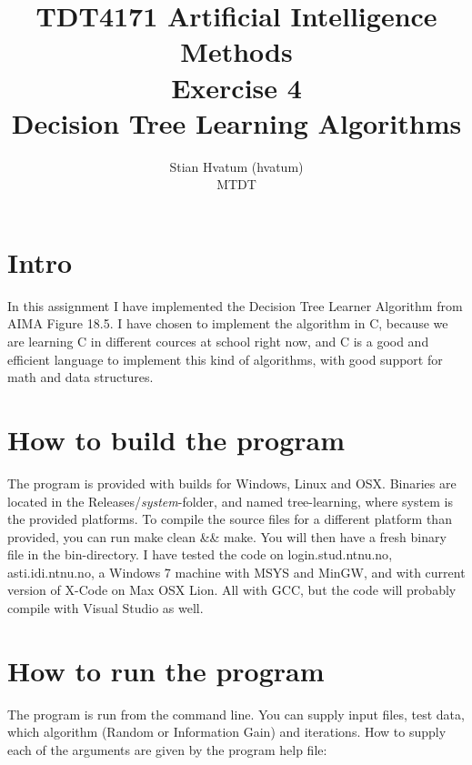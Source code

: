 \documentclass[english,a4paper]{scrartcl}
\title{TDT4171 Artificial Intelligence Methods\\
\Small Exercise 4\\
\Huge Decision Tree Learning Algorithms}
\author{Stian Hvatum (hvatum)\\MTDT}
\begin{document}
\maketitle
\thispagestyle{empty}
\newpage
{}
\tableofcontents
\newpage
{}
\section{Intro}
In this assignment I have implemented the Decision Tree Learner Algorithm from
AIMA Figure 18.5. I have chosen to implement the algorithm in C, because we are
learning C in different cources at school right now, and C is a good and
efficient language to implement this kind of algorithms, with good support for
math and data structures.

\section{How to build the program}
The program is provided with builds for Windows, Linux and OSX. Binaries are
located in the {\ttfamily Releases/\emph{system}}-folder, and named
{\ttfamily tree-learning}, where system is the provided platforms. To compile
the source files for a different platform than provided, you can run {\ttfamily
make clean \&\& make}. You will then have a fresh binary file in the {\ttfamily
bin}-directory. I have tested the code on {\ttfamily login.stud.ntnu.no},
{\ttfamily asti.idi.ntnu.no}, a Windows 7 machine with MSYS and MinGW, and with
current version of X-Code on Max OSX Lion. All with GCC, but the code will
probably compile with Visual Studio as well.

\section{How to run the program}
The program is run from the command line. You can supply input files, test data,
which algorithm (Random or Information Gain) and iterations. How to supply each
of the arguments are given by the program help file:\\
\end{document}
